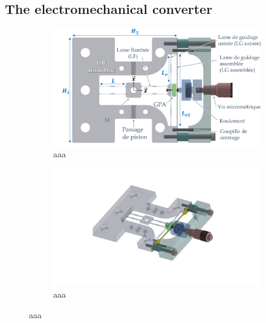 \documentclass[3p,twocolumn,preprint]{elsarticle}
\begin{document}
	\subsection{The electromechanical converter}	
	\label{The electromechanical converter}
\begin{figure}[!htbp]
\begin{center}
\captionsetup{justification=centering}
	\begin{subfigure} [h!]{0.49\textwidth}
		\includegraphics[trim={1.4cm 0cm 0cm 0cm},clip,width=\textwidth]{figures/monobloc+GPA_face.pdf}
		\caption{aaa} 
		\label{fig:/monobloc+GPA_face}
	\end{subfigure}
	\begin{subfigure}[h!]{0.49\textwidth}
		\includegraphics[trim={6cm 3cm 7.5cm 2.6cm},clip, width=\textwidth]{figures/monobloc+GPA_iso.pdf}
		\caption{aaa}  
		\label{fig:/monobloc+GPA_iso}
	\end{subfigure}
	\caption{aaa}
\end{center}
\label{fig:/monobloc+GPA_face}
\end{figure}
\end{document}
